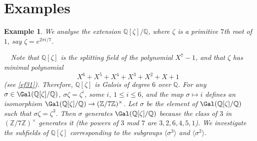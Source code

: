 \documentclass[a4paper,11pt,final,openany]{memoir}
\newtheorem{example}[X]{Example}
\theoremstyle{nonumberplain}
\begin{document}
\section{Examples}

\begin{example}
\label{ft19}We analyse the extension $\mathbb{Q}[\zeta]/\mathbb{Q}$, where
$\zeta$ is a primitive $7$th root of $1$, say $\zeta=e^{2\pi i/7}$.

\smallskip\noindent\begin{minipage}{3.0in}
$\quad$Note that $\mathbb{Q}[\zeta]$ is the splitting field of the polynomial
$X^{7}-1$, and that $\zeta$ has minimal polynomial
\[
X^{6}+X^{5}+X^{4}+X^{3}+X^{2}+X+1
\]
(see \ref{ef31}). Therefore, $\mathbb{Q}{}[\zeta]$ is Galois of degree $6$
over $\mathbb{Q}$. For any $\sigma\in \Gal(\mathbb{Q}[\zeta]/\mathbb{Q})$, $\sigma\zeta=\zeta^{i}$, some $i$,
$1\leq i\leq6$, and the map $\sigma\mapsto i$ defines an isomorphism
$\Gal(\mathbb{Q}[\zeta]/\mathbb{Q})\rightarrow(\mathbb{Z}/7\mathbb{Z}%
)^{\times}$. Let $\sigma$ be the element of $\Gal(\mathbb{Q}[\zeta
]/\mathbb{Q})$ such that $\sigma\zeta=\zeta^{3}$. Then $\sigma$ generates
$\Gal(\mathbb{Q}[\zeta]/\mathbb{Q})$ because the class of $3$ in
$(\mathbb{Z}/7\mathbb{Z})^{\times}$ generates it (the powers of $3$ mod $7$
are $3,2,6,4,5,1$). We investigate the subfields of $\mathbb{Q}[\zeta]$
corresponding to the subgroups $\langle{}\sigma^{3}\rangle$ and $\langle
{}\sigma^{2}\rangle$.
\end{minipage}
\begin{minipage}{2.5in}
\end{minipage}



\end{example}
\end{document}
